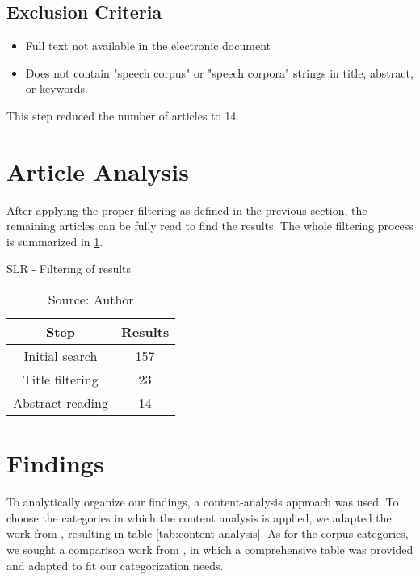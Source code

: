 \subsection*{Exclusion Criteria}

\begin{itemize}
    \item Full text not available in the electronic document
    \item Does not contain "speech corpus" or "speech corpora" strings in title, abstract, or keywords.
\end{itemize}

This step reduced the number of articles to 14.

\section{Article Analysis}

After applying the proper filtering as defined in the previous section, the remaining articles can be fully read to find the results. The whole filtering process is summarized in \ref{tab:slr-filtering}.

\begin{table}[h]
    \centering
    \caption{SLR - Filtering of results}
    \begin{tabular}{|c|c|}
        \hline Step & Results \\ \hline
        Initial search & 157 \\ \hline
        Title filtering & 23 \\ \hline
        Abstract reading & 14 \\ \hline
    \end{tabular}
    \caption*{Source: Author}
    \label{tab:slr-filtering}
\end{table}

\section{Findings}

To analytically organize our findings, a content-analysis approach was used. To choose the categories in which the content analysis is applied, we adapted the work from \cite{queiroz2019blockchain}, resulting in table \ref{tab:content-analysis}. As for the corpus categories, we sought a comparison work from  \cite{LeRouxVincent2014TRdatasets}, in which a comprehensive table was provided and adapted to fit our categorization needs.

